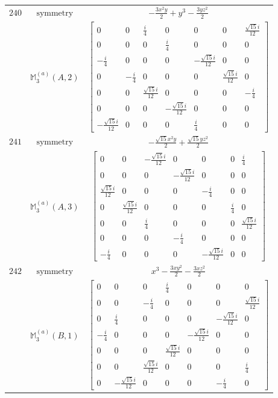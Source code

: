 \documentclass[fleqn,8pt,landscape]{jsarticle}
\begin{document}
\begin{longtable}{ccc}
$ 240 $ & $ \text{symmetry} $ & $ - \frac{3 x^{2} y}{2} + y^{3} - \frac{3 y z^{2}}{2} $ \\
$  $ & $ \mathbb{M}_{3}^{(a)}(A,2) $ & $ \begin{bmatrix} 0 & 0 & \frac{i}{4} & 0 & 0 & 0 & \frac{\sqrt{15} i}{12} \\ 0 & 0 & 0 & \frac{i}{4} & 0 & 0 & 0 \\ - \frac{i}{4} & 0 & 0 & 0 & - \frac{\sqrt{15} i}{12} & 0 & 0 \\ 0 & - \frac{i}{4} & 0 & 0 & 0 & \frac{\sqrt{15} i}{12} & 0 \\ 0 & 0 & \frac{\sqrt{15} i}{12} & 0 & 0 & 0 & - \frac{i}{4} \\ 0 & 0 & 0 & - \frac{\sqrt{15} i}{12} & 0 & 0 & 0 \\ - \frac{\sqrt{15} i}{12} & 0 & 0 & 0 & \frac{i}{4} & 0 & 0 \end{bmatrix} $ \\ \hline
$ 241 $ & $ \text{symmetry} $ & $ - \frac{\sqrt{15} x^{2} y}{2} + \frac{\sqrt{15} y z^{2}}{2} $ \\
$  $ & $ \mathbb{M}_{3}^{(a)}(A,3) $ & $ \begin{bmatrix} 0 & 0 & - \frac{\sqrt{15} i}{12} & 0 & 0 & 0 & \frac{i}{4} \\ 0 & 0 & 0 & - \frac{\sqrt{15} i}{12} & 0 & 0 & 0 \\ \frac{\sqrt{15} i}{12} & 0 & 0 & 0 & - \frac{i}{4} & 0 & 0 \\ 0 & \frac{\sqrt{15} i}{12} & 0 & 0 & 0 & \frac{i}{4} & 0 \\ 0 & 0 & \frac{i}{4} & 0 & 0 & 0 & \frac{\sqrt{15} i}{12} \\ 0 & 0 & 0 & - \frac{i}{4} & 0 & 0 & 0 \\ - \frac{i}{4} & 0 & 0 & 0 & - \frac{\sqrt{15} i}{12} & 0 & 0 \end{bmatrix} $ \\ \hline
$ 242 $ & $ \text{symmetry} $ & $ x^{3} - \frac{3 x y^{2}}{2} - \frac{3 x z^{2}}{2} $ \\
$  $ & $ \mathbb{M}_{3}^{(a)}(B,1) $ & $ \begin{bmatrix} 0 & 0 & 0 & \frac{i}{4} & 0 & 0 & 0 \\ 0 & 0 & - \frac{i}{4} & 0 & 0 & 0 & \frac{\sqrt{15} i}{12} \\ 0 & \frac{i}{4} & 0 & 0 & 0 & - \frac{\sqrt{15} i}{12} & 0 \\ - \frac{i}{4} & 0 & 0 & 0 & - \frac{\sqrt{15} i}{12} & 0 & 0 \\ 0 & 0 & 0 & \frac{\sqrt{15} i}{12} & 0 & 0 & 0 \\ 0 & 0 & \frac{\sqrt{15} i}{12} & 0 & 0 & 0 & \frac{i}{4} \\ 0 & - \frac{\sqrt{15} i}{12} & 0 & 0 & 0 & - \frac{i}{4} & 0 \end{bmatrix} $ \\ \hline

\end{longtable}
\end{document}
